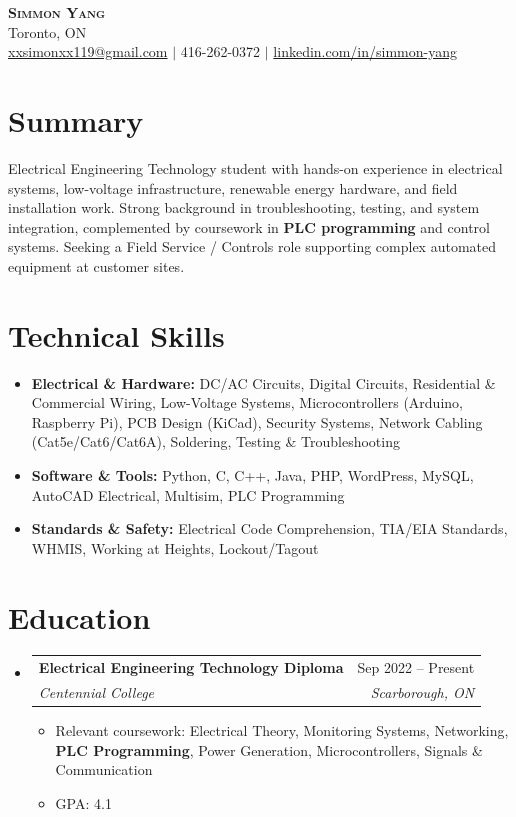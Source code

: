 \documentclass[letterpaper,11pt]{article}
\makeatletter
\newcommand{\resumeItem}[1]{\item\small{{#1 \vspace{-2pt}}}}
\newcommand{\resumeSubheading}[4]{
  \vspace{-2pt}\item
    \begin{tabular*}{0.97\textwidth}[t]{l@{\extracolsep{\fill}}r}
      \textbf{#1} & #2 \\
      \textit{\small #3} & \textit{\small #4} \\
    \end{tabular*}\vspace{-7pt}
}
\newcommand{\resumeSubHeadingListStart}{\begin{itemize}[leftmargin=0.15in, label={}]}
\newcommand{\resumeSubHeadingListEnd}{\end{itemize}}
\newcommand{\resumeItemListStart}{\begin{itemize}}
\newcommand{\resumeItemListEnd}{\end{itemize}\vspace{-5pt}}
\makeatother
\begin{document}
\begin{center}
    \textbf{\Huge \scshape Simmon Yang} \\ \vspace{1pt}
    Toronto, ON \\ 
    \href{mailto:xxsimonxx119@gmail.com}{xxsimonxx119@gmail.com} $|$ 416-262-0372 $|$ 
    \href{https://www.linkedin.com/in/simmon-yang/}{linkedin.com/in/simmon-yang}
\end{center}

\section{Summary}
Electrical Engineering Technology student with hands-on experience in electrical systems, low-voltage infrastructure, renewable energy hardware, and field installation work. Strong background in troubleshooting, testing, and system integration, complemented by coursework in \textbf{PLC programming} and control systems. Seeking a Field Service / Controls role supporting complex automated equipment at customer sites.

\section{Technical Skills}
\begin{itemize}[leftmargin=0.15in]
  \item \textbf{Electrical \& Hardware:} DC/AC Circuits, Digital Circuits, Residential \& Commercial Wiring, Low-Voltage Systems, Microcontrollers (Arduino, Raspberry Pi), PCB Design (KiCad), Security Systems, Network Cabling (Cat5e/Cat6/Cat6A), Soldering, Testing \& Troubleshooting
  \item \textbf{Software \& Tools:} Python, C, C++, Java, PHP, WordPress, MySQL, AutoCAD Electrical, Multisim, PLC Programming
  \item \textbf{Standards \& Safety:} Electrical Code Comprehension, TIA/EIA Standards, WHMIS, Working at Heights, Lockout/Tagout
\end{itemize}

\section{Education}
\resumeSubHeadingListStart
\resumeSubheading
  {Electrical Engineering Technology Diploma}{Sep 2022 -- Present}
  {Centennial College}{Scarborough, ON}
\resumeItemListStart
  \resumeItem{Relevant coursework: Electrical Theory, Monitoring Systems, Networking, \textbf{PLC Programming}, Power Generation, Microcontrollers, Signals \& Communication}
  \resumeItem{GPA: 4.1}
\resumeItemListEnd
\resumeSubHeadingListEnd
\end{document}
